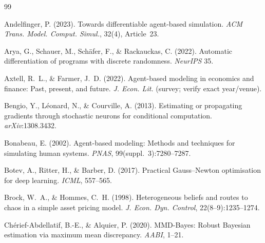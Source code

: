 \documentclass[10pt,twocolumn]{article}
\newcommand{\vc}{\textcolor{red}{$^{\dagger}$}}
\begin{document}
\clearpage

{\small
\begin{thebibliography}{99}
\setlength{\itemsep}{1pt}

Andelfinger, P. (2023). Towards differentiable agent-based simulation.
\textit{ACM Trans. Model. Comput. Simul.}, 32(4), Article~23.

Arya, G., Schauer, M., Sch\"afer, F., \& Rackauckas, C. (2022). Automatic
differentiation of programs with discrete randomness. \textit{NeurIPS} 35.

Axtell, R.~L., \& Farmer, J.~D. (2022). Agent-based modeling in economics and
finance: Past, present, and future. \textit{J. Econ. Lit.} (survey; verify exact
year/venue).

Bengio, Y., L\'eonard, N., \& Courville, A. (2013). Estimating or propagating
gradients through stochastic neurons for conditional computation.
\textit{arXiv}:1308.3432.

Bonabeau, E. (2002). Agent-based modeling: Methods and techniques for simulating
human systems. \textit{PNAS}, 99(suppl.~3):7280--7287.

Botev, A., Ritter, H., \& Barber, D. (2017). Practical Gauss--Newton optimisation
for deep learning. \textit{ICML}, 557--565.

Brock, W.~A., \& Hommes, C.~H. (1998). Heterogeneous beliefs and routes to chaos in
a simple asset pricing model. \textit{J. Econ. Dyn. Control}, 22(8--9):1235--1274.

Ch\'erief-Abdellatif, B.-E., \& Alquier, P. (2020). MMD-Bayes: Robust Bayesian
estimation via maximum mean discrepancy. \textit{AABI}, 1--21.


\end{thebibliography}}
\end{document}
